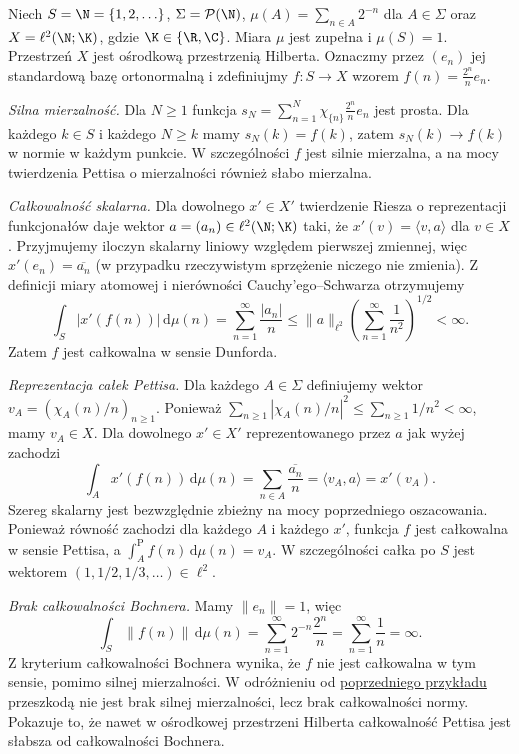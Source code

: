 \begin{przyklad}
\label{ex:pettis-strong-not-bochner15b}
Niech $S=\N=\{1,2,\ldots\}$, $\Sigma=\mathcal P(\N)$,
$\mu(A)=\sum_{n\in A}2^{-n}$ dla $A\in\Sigma$ oraz
$X=\ell^2(\N;\K)$, gdzie $\K\in\{\R,\C\}$. Miara $\mu$ jest
zupełna i $\mu(S)=1$. Przestrzeń $X$ jest ośrodkową
przestrzenią Hilberta. Oznaczmy przez $(e_n)$ jej standardową
bazę ortonormalną i zdefiniujmy
$f:S\to X$ wzorem $f(n)=\frac{2^n}{n}e_n$.

\emph{Silna mierzalność.} Dla $N\ge1$ funkcja
$s_N=\sum_{n=1}^N\chi_{\{n\}}\frac{2^n}{n}e_n$ jest prosta.
Dla każdego $k\in S$ i każdego $N\ge k$ mamy $s_N(k)=f(k)$,
zatem $s_N(k)\to f(k)$ w normie w każdym punkcie.
W szczególności $f$ jest silnie mierzalna, a na mocy
twierdzenia Pettisa o mierzalności również słabo mierzalna.

\emph{Całkowalność skalarna.} Dla dowolnego $x'\in X'$
twierdzenie Riesza o reprezentacji funkcjonałów daje
wektor $a=(a_n)\in\ell^2(\N;\K)$ taki, że
$x'(v)=\langle v,a\rangle$ dla $v\in X$.
Przyjmujemy iloczyn skalarny liniowy względem pierwszej
zmiennej, więc $x'(e_n)=\overline{a_n}$ (w przypadku
rzeczywistym sprzężenie niczego nie zmienia). Z definicji
miary atomowej i nierówności Cauchy'ego--Schwarza otrzymujemy
\[
 \int_S|x'(f(n))|\,\mathrm d\mu(n)
 =\sum_{n=1}^{\infty}\frac{|a_n|}{n}
 \le \|a\|_{\ell^2}
       \left(\sum_{n=1}^{\infty}\frac1{n^2}\right)^{1/2}
 <\infty.
\]
Zatem $f$ jest całkowalna w sensie Dunforda.

\emph{Reprezentacja całek Pettisa.} Dla każdego $A\in\Sigma$
definiujemy wektor $v_A=(\chi_A(n)/n)_{n\ge1}$.
Ponieważ $\sum_{n\ge1}|\chi_A(n)/n|^2
\le\sum_{n\ge1}1/n^2<\infty$, mamy $v_A\in X$.
Dla dowolnego $x'\in X'$ reprezentowanego przez $a$ jak wyżej
zachodzi
\[
 \int_A x'(f(n))\,\mathrm d\mu(n)
 =\sum_{n\in A}\frac{\overline{a_n}}{n}
 =\langle v_A,a\rangle=x'(v_A).
\]
Szereg skalarny jest bezwzględnie zbieżny na mocy
poprzedniego oszacowania. Ponieważ równość zachodzi dla
każdego $A$ i każdego $x'$, funkcja $f$ jest całkowalna
w sensie Pettisa, a
$\int_A^{\mathrm P} f(n)\,\mathrm d\mu(n)=v_A$.
W szczególności całka po $S$ jest wektorem
$(1,1/2,1/3,\ldots)\in\ell^2$.

\emph{Brak całkowalności Bochnera.} Mamy $\|e_n\|=1$,
więc
\[
 \int_S\|f(n)\|\,\mathrm d\mu(n)
 =\sum_{n=1}^{\infty}2^{-n}\frac{2^n}{n}
 =\sum_{n=1}^{\infty}\frac1n=\infty.
\]
Z kryterium całkowalności Bochnera wynika, że $f$ nie
jest całkowalna w tym sensie, pomimo silnej mierzalności.
W odróżnieniu od \hyperref[ex:pettis-not-bochner15b]{poprzedniego przykładu}
przeszkodą nie jest brak silnej mierzalności, lecz brak
całkowalności normy. Pokazuje to, że nawet w ośrodkowej
przestrzeni Hilberta całkowalność Pettisa jest słabsza
od całkowalności Bochnera.
\end{przyklad}

